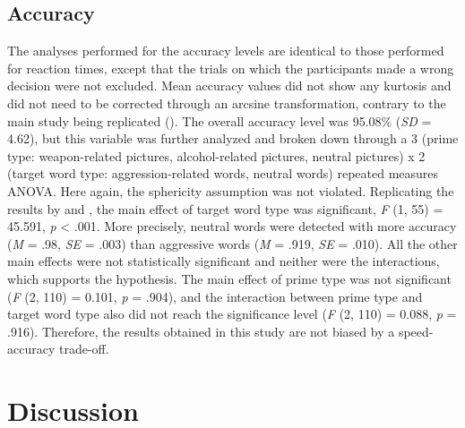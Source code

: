\documentclass[serif, twocolumn, numeric, empirical]{jote-article}
\begin{document}
{}
\subsection*{Accuracy}
The analyses performed for the accuracy levels are identical to those performed for reaction times, except that the trials on which the participants made a wrong decision were not excluded. Mean accuracy values did not show any kurtosis and did not need to be corrected through an arcsine transformation, contrary to the main study being replicated (\cite{BartholowHeinz2006}). The overall accuracy level was 95.08$\%$  (\textit{SD }= 4.62), but this variable was further analyzed and broken down through a 3 (prime type: weapon-related pictures, alcohol-related pictures, neutral pictures) x 2 (target word type: aggression-related words, neutral words) repeated measures ANOVA. Here again, the sphericity assumption was not violated. Replicating the results by \textcite{BartholowHeinz2006} and \textcite{SubraMullerBegueLBushmanDelmas2010}, the main effect of target word type was significant, \textit{F }(1, 55) = 45.591, \textit{p }< .001. More precisely, neutral words were detected with more accuracy (\textit{M }= .98, \textit{SE }= .003) than aggressive words (\textit{M }= .919, \textit{SE }= .010). All the other main effects were not statistically significant and neither were the interactions, which supports the hypothesis. The main effect of prime type was not significant (\textit{F} (2, 110) = 0.101, \textit{p }= .904), and the interaction between prime type and target word type also did not reach the significance level (\textit{F }(2, 110) = 0.088, \textit{p }= .916). Therefore, the results obtained in this study are not biased by a speed-accuracy trade-off.  

{}
\section*{Discussion} %
\label{sec:discussion}
\end{document}
